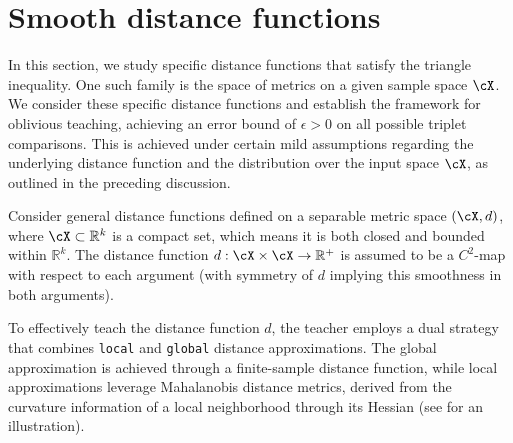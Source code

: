 \section{Smooth distance functions}
In this section, we study specific distance functions that satisfy the triangle inequality. One such family is the space of metrics on a given sample space $\cX$. We consider these specific distance functions and establish the framework for oblivious teaching, achieving an error bound of \(\epsilon > 0\) on all possible triplet comparisons. This is achieved under certain mild assumptions regarding the underlying distance function and the distribution over the input space \(\cX\), as outlined in the preceding discussion.

Consider general distance functions defined on a separable metric space \((\cX, d)\), where \(\cX \subset \mathbb{R}^k\) is a compact set, which means it is both closed and bounded within \(\mathbb{R}^k\). The distance function \(d: \cX \times \cX \to \mathbb{R}^{+}\) is assumed to be a \(C^2\)-map with respect to each argument (with symmetry of \(d\) implying this smoothness in both arguments). 

To effectively teach the distance function \(d\), the teacher employs a dual strategy that combines \texttt{local} and \texttt{global} distance approximations. The global approximation is achieved through a finite-sample distance function, while local approximations leverage Mahalanobis distance metrics, derived from the curvature information of a local neighborhood through its Hessian (see  for an illustration).

